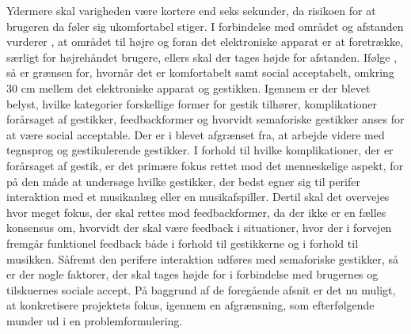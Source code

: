 Ydermere skal varigheden være kortere end seks sekunder, da risikoen for at brugeren da føler sig ukomfortabel stiger. I forbindelse med området og afstanden vurderer \textcite[s. 201]{PDF:AreYouComfortableDoingThat}, at området til højre og foran det elektroniske apparat er at foretrække, særligt for højrehåndet brugere, ellers skal der tages højde for afstanden. Ifølge \textcite[s. 201]{PDF:AreYouComfortableDoingThat}, så er grænsen for, hvornår det er komfortabelt samt social acceptabelt, omkring 30 cm mellem det elektroniske apparat og gestikken.\blankline
Igennem  er der blevet belyst, hvilke kategorier forskellige former for gestik tilhører, komplikationer forårsaget af gestikker, feedbackformer og hvorvidt semaforiske gestikker anses for at være social acceptable. Der er i  blevet afgrænset fra, at arbejde videre med tegnsprog og gestikulerende gestikker. I forhold til hvilke komplikationer, der er forårsaget af gestik, er det primære fokus rettet mod det menneskelige aspekt, for på den måde at undersøge hvilke gestikker, der bedst egner sig til perifer interaktion med et musikanlæg eller en musikafspiller. Dertil skal det overvejes hvor meget fokus, der skal rettes mod feedbackformer, da der ikke er en fælles konsensus om, hvorvidt der skal være feedback i situationer, hvor der i forvejen fremgår funktionel feedback både i forhold til gestikkerne og i forhold til musikken. Såfremt den perifere interaktion udføres med semaforiske gestikker, så er der nogle faktorer, der skal tages højde for i forbindelse med brugernes og tilskuernes sociale accept.\blankline
% 
På baggrund af de foregående afsnit er det nu muligt, at konkretisere projektets fokus, igennem en afgrænsning, som efterfølgende munder ud i en problemformulering.  








